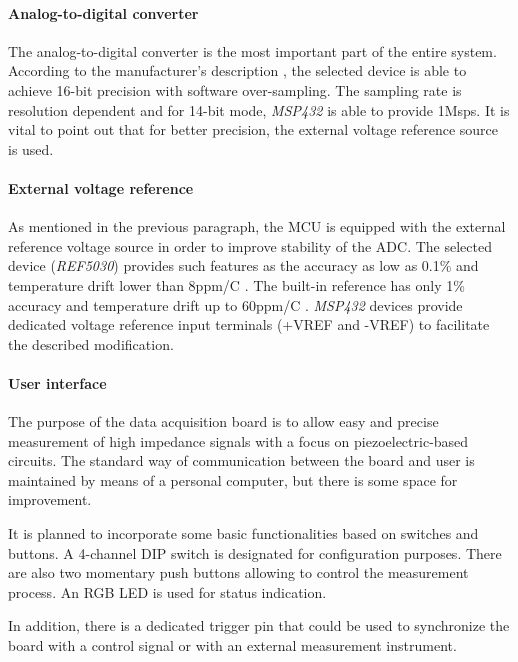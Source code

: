 \documentclass[12pt,a4paper]{article}
\begin{document}
\par

\paragraph{Analog-to-digital converter}
The analog-to-digital converter is the most important part of the entire system. According to the manufacturer's description \cite{msp432_params}, the selected device is able to achieve 16-bit precision with software over-sampling. The sampling rate is resolution dependent and for 14-bit mode, \textit{MSP432} is able to provide 1Msps. It is vital to point out that for better precision, the external voltage reference source is used. 
\par

\paragraph{External voltage reference}
As mentioned in the previous paragraph, the MCU is equipped with the external reference voltage source in order to improve stability of the ADC. The selected device (\textit{REF5030})  provides such features as the accuracy as low as 0.1\% and temperature drift lower than 8ppm/\degree C \cite{ref5030_params}. The built-in reference has only 1\% accuracy and temperature drift up to 60ppm/\degree C \cite{msp432_params}. \textit{MSP432} devices provide dedicated voltage reference input terminals (+VREF and -VREF) to facilitate the described modification.
\par

\paragraph{User interface} 
The purpose of the data acquisition board is to allow easy and precise measurement of high impedance signals with a focus on piezoelectric-based circuits. The standard way of communication between the board and user is maintained by means of a personal computer, but there is some space for improvement.
\par
It is planned to incorporate some basic functionalities based on switches and buttons. A 4-channel DIP switch is designated for configuration purposes. There are also two momentary push buttons allowing to control the measurement process. An RGB LED is used for status indication.
\par
In addition, there is a dedicated trigger pin that could be used to synchronize the board with a control signal or with an external measurement instrument.
\par
\end{document}
